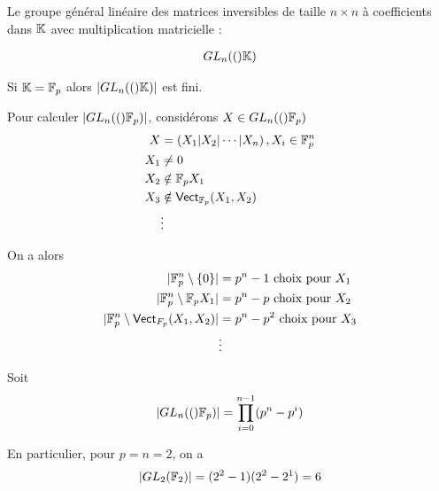 \documentclass[french,a4paper,10pt]{article}
\begin{document}
	\begin{myexample}
		Le groupe général linéaire des matrices inversibles de taille $n\times n$ à coefficients dans $\mathbb{K}$ avec multiplication matricielle :
		
		\[\begin{aligned}
			GL_n(()\mathbb{K})
		\end{aligned}\]
		
		\begin{myremark}
			Si $\mathbb{K} = \mathbb{F}_p$ alors $|GL_n(()\mathbb{K})|$ est fini.
		\end{myremark}
		
		Pour calculer $|GL_n(()\mathbb{F}_p)|$, considérons $X\in GL_n(()\mathbb{F}_p)$
		\[\begin{aligned}
			X &= \left(X_1 | X_2 | \cdots | X_n\right), X_i\in \mathbb{F}_p^n\\
			X_1 &\ne 0\\
			X_2 &\notin \mathbb{F}_p X_1\\
			X_3 &\notin \operatorname{\mathsf{Vect}}_{\mathbb{F}_p}(X_1, X_2)\\
			&\vdots
		\end{aligned}\]
		
		On a alors
		\[\begin{aligned}
			|\mathbb{F}_p^n\setminus\{0\}| &= p^n-1 \text{ choix pour }X_1\\
			|\mathbb{F}_p^n\setminus\mathbb{F}_pX_1| &= p^n-p \text{ choix pour }X_2\\
			|\mathbb{F}_p^n\setminus\operatorname{\mathsf{Vect}}_{F_p}(X_1, X_2)| &= p^n-p^2 \text{ choix pour }X_3\\
			&\vdots
		\end{aligned}\]
		
		Soit
		\[\begin{aligned}
			|GL_n(()\mathbb{F}_p)| = \prod_{i=0}^{n-1}(p^n-p^i)
		\end{aligned}\]
		
		En particulier, pour $p=n=2$, on a
		\[\begin{aligned}
			|GL_2(\mathbb{F}_2)| = (2^2-1)(2^2-2^1)=6
		\end{aligned}\]
	\end{myexample}
\end{document}
